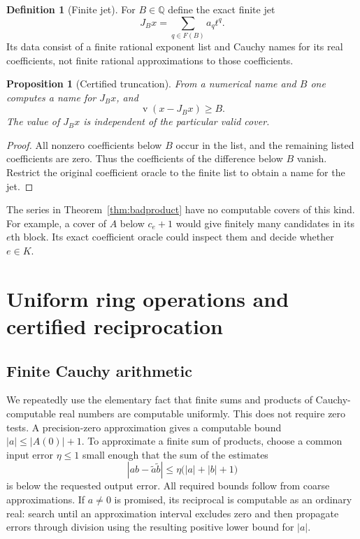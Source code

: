 \documentclass[11pt,letterpaper]{article}
\numberwithin{equation}{section}
\newtheorem{proposition}[theorem]{Proposition}
\theoremstyle{definition}
\newtheorem{definition}[theorem]{Definition}
\theoremstyle{remark}
\newcommand{\Q}{\mathbb Q}
\newcommand{\val}{\operatorname{v}}
\begin{document}
\begin{definition}[Finite jet]
For $B\in\Q$ define the exact finite jet
\[
 J_Bx=\sum_{q\in F(B)}a_qt^q.
\]
Its data consist of a finite rational exponent list and Cauchy names for its
real coefficients, not finite rational approximations to those coefficients.
\end{definition}

\begin{proposition}[Certified truncation]
\label{prop:jets}
From a numerical name and $B$ one computes a name for $J_Bx$, and
\[
 \val(x-J_Bx)\ge B.
\]
The value of $J_Bx$ is independent of the particular valid cover.
\end{proposition}
\begin{proof}
All nonzero coefficients below $B$ occur in the list, and the remaining
listed coefficients are zero. Thus the coefficients of the difference
below $B$ vanish. Restrict the original coefficient oracle to the finite
list to obtain a name for the jet.
\end{proof}

The series in Theorem~\ref{thm:badproduct} have no computable covers of this
kind. For example, a cover of $A$ below $c_e+1$ would give finitely many
candidates in its $e$th block. Its exact coefficient oracle could inspect
them and decide whether $e\in K$.

\section{Uniform ring operations and certified reciprocation}
\label{sec:arithmetic}

\subsection{Finite Cauchy arithmetic}

We repeatedly use the elementary fact that finite sums and products of
Cauchy-computable real numbers are computable uniformly. This does not
require zero tests. A precision-zero approximation gives a computable bound
$|a|\le |A(0)|+1$. To approximate a finite sum of products, choose a common
input error $\eta\le1$ small enough that the sum of the estimates
\[
 |ab-\widetilde a\widetilde b|
 \le \eta\bigl(|a|+|b|+1\bigr)
\]
is below the requested output error. All required bounds follow from coarse
approximations. If $a\ne0$ is promised, its reciprocal is computable as an
ordinary real: search until an approximation interval excludes zero and
then propagate errors through division using the resulting positive lower
bound for $|a|$.
\end{document}
